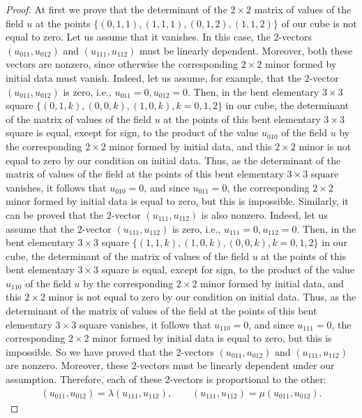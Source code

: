 \documentclass[pdftex]{sigma}
\begin{document}
\begin{proof}
At f\/irst we prove that the determinant of the $2 \times 2$ matrix of
values of the f\/ield $u$ at the points $\{(0, 1, 1), (1, 1, 1), (0,
1, 2), (1, 1, 2)\}$ of our cube is not equal to zero. Let us assume
that it vanishes. In this case, the $2$-vectors $(u_{0 1 1}, u_{0 1
2})$ and $(u_{1 1 1}, u_{1 1 2})$ must be linearly dependent.
Moreover, both these vectors are nonzero, since otherwise the
corresponding $2 \times 2$ minor formed by initial data must vanish.
Indeed, let us assume, for example, that the $2$-vector $(u_{0 1 1},
u_{0 1 2})$ is zero, i.e., $u_{0 1 1} = 0, u_{0 1 2} = 0.$ Then, in
the bent elementary $3 \times 3$ square $\{(0, 1, k), (0, 0, k), (1,
0, k), k = 0, 1, 2\}$ in our cube, the determinant of the matrix of
values of the f\/ield $u$ at the points of this bent elementary $3
\times 3$ square is equal, except for sign, to the product of the
value $u_{0 1 0}$ of the f\/ield $u$ by the corresponding $2 \times 2$
minor formed by initial data, and this $2 \times 2$ minor is not
equal to zero by our condition on initial data. Thus, as the
determinant of the matrix of values of the f\/ield at the points of
this bent elementary $3 \times 3$ square vanishes, it follows that
$u_{0 1 0} = 0$, and since $u_{0 1 1} = 0$, the corresponding $2
\times 2$ minor formed by initial data is equal to zero, but this is
impossible. Similarly, it can be proved that the $2$-vector $(u_{1 1
1}, u_{1 1 2})$ is also nonzero. Indeed, let us assume that the
$2$-vector $(u_{1 1 1}, u_{1 1 2})$ is zero, i.e., $u_{1 1 1} = 0,
u_{1 1 2} = 0.$ Then, in the bent elementary $3 \times 3$ square
$\{(1, 1, k), (1, 0, k), (0, 0, k), k = 0, 1, 2\}$ in our cube, the
determinant of the matrix of values of the f\/ield $u$ at the points
of this bent elementary $3 \times 3$ square is equal, except for
sign, to the product of the value $u_{1 1 0}$ of the f\/ield $u$ by
the corresponding $2 \times 2$ minor formed by initial data, and
this $2 \times 2$ minor is not equal to zero by our condition on
initial data. Thus, as the determinant of the matrix of values of
the f\/ield at the points of this bent elementary $3 \times 3$ square
vanishes, it follows that $u_{1 1 0} = 0$, and since $u_{1 1 1} =
0$, the corresponding $2 \times 2$ minor formed by initial data is
equal to zero, but this is impossible. So we have proved that the
$2$-vectors $(u_{0 1 1}, u_{0 1 2})$ and $(u_{1 1 1}, u_{1 1 2})$
are nonzero. Moreover, these $2$-vectors must be linearly dependent
under our assumption. Therefore, each of these $2$-vectors is
proportional to the other: \begin{gather} (u_{0 1 1}, u_{0 1 2}) = \lambda
(u_{1 1 1}, u_{1 1 2}), \qquad (u_{1 1 1}, u_{1 1 2}) = \mu (u_{0 1
1}, u_{0 1 2}). \label{6xx} \end{gather}


\end{proof}
\end{document}
